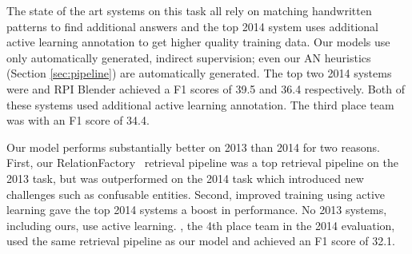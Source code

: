 The state of the art systems on this task all rely on matching handwritten patterns to find additional answers and the top 2014 system uses additional active learning annotation to get higher quality training data. Our models use only automatically generated, indirect supervision; even our AN heuristics (Section \ref{sec:pipeline}) are automatically generated. The top two 2014 systems were \citet{angeli2014stanford} and RPI Blender \citep{SurdeanuMihai2014} achieved a F1 scores of 39.5 and 36.4 respectively. Both of these systems used additional active learning annotation. The third place team was \citet{Lin2014} with an F1 score of 34.4. 

Our model performs substantially better on 2013 than 2014 for two reasons. First, our RelationFactory~\citep{roth2014relationfactory} retrieval pipeline was a top retrieval pipeline on the 2013 task, but was outperformed on the 2014 task which introduced new challenges such as confusable entities. Second, improved training using active learning gave the top 2014 systems a boost in performance. No 2013 systems, including ours, use active learning. \citet{bentortac14}, the 4th place team in the 2014 evaluation, used the same retrieval pipeline \citep{roth2014relationfactory} as our model and achieved an F1 score of 32.1.



